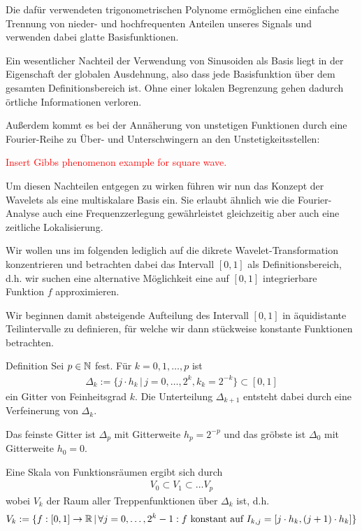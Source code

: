 Die dafür verwendeten trigonometrischen Polynome ermöglichen eine einfache Trennung von nieder- und hochfrequenten 
Anteilen unseres Signals und verwenden dabei glatte Basisfunktionen. 

Ein wesentlicher Nachteil der Verwendung von Sinusoiden als Basis liegt in der Eigenschaft der globalen Ausdehnung, 
also dass jede Basisfunktion über dem gesamten Definitionsbereich \grqq{} ist. Ohne einer 
lokalen Begrenzung gehen dadurch örtliche Informationen verloren. 

Außerdem kommt es bei der Annäherung von unstetigen Funktionen durch eine Fourier-Reihe zu Über- und Unterschwingern 
an den Unstetigkeitsstellen:

\textcolor{red}{Insert Gibbs phenomenon example for square wave.}

Um diesen Nachteilen entgegen zu wirken führen wir nun das Konzept der Wavelets als eine multiskalare Basis ein. 
Sie erlaubt ähnlich wie die Fourier-Analyse auch eine Frequenzzerlegung gewährleistet gleichzeitig aber auch eine 
zeitliche Lokalisierung. 

Wir wollen uns im folgenden lediglich auf die dikrete Wavelet-Transformation konzentrieren und betrachten dabei 
das Intervall $[0,1]$ als Definitionsbereich, d.h. wir suchen eine alternative Möglichkeit eine auf $[0,1]$ integrierbare 
Funktion $f$ approximieren. 

Wir beginnen damit absteigende Aufteilung des Intervall $[0,1]$ in äquidistante Teilintervalle zu definieren, 
für welche wir dann stückweise konstante Funktionen betrachten. 

\begin{colbox}{Definition}
  Sei $p\in\mathbb N$ fest. Für $k=0,1,\dots,p$ ist 
  \begin{align*}
    \Delta_k := \{j\cdot h_k \,|\, j=0,\dots,2^k, k_k=2^{-k}\} \subset [0,1]
  \end{align*}
  ein Gitter von Feinheitsgrad $k$. Die Unterteilung $\Delta_{k+1}$ entsteht dabei durch eine Verfeinerung 
  von $\Delta_k$. 

  Das feinste Gitter ist $\Delta_p$ mit Gitterweite $h_p=2^{-p}$ und das gröbste ist $\Delta_0$ mit Gitterweite $h_0=0$.

  Eine Skala von Funktionsräumen ergibt sich durch 
  \begin{align*}
    V_0 \subset V_1 \subset \dots V_p
  \end{align*}
  wobei $V_k$ der Raum aller Treppenfunktionen über $\Delta_k$ ist, d.h. 
  \begin{align*}
    V_k := \{f:[0,1]\to\mathbb R \,|\, \forall j=0,\dots,2^k-1: f \text{ konstant auf } I_{k,j}=[j\cdot h_k, (j+1)\cdot h_k] \}
  \end{align*}
\end{colbox}

